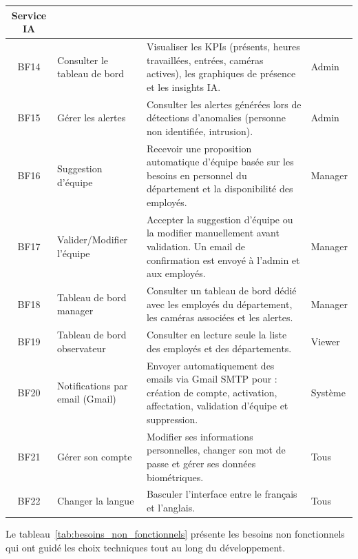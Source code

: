 \begin{longtable}{|c|>{\raggedright\arraybackslash}p{5cm}|>{\raggedright\arraybackslash}p{6cm}|l|}
    Service IA \\
  \hline
  BF14 & Consulter le tableau de bord &
    Visualiser les KPIs (présents, heures travaillées, entrées, caméras actives), les graphiques de présence et les insights IA. &
    Admin \\
  \hline
  BF15 & Gérer les alertes &
    Consulter les alertes générées lors de détections d'anomalies (personne non identifiée, intrusion). &
    Admin \\
  \hline
  BF16 & Suggestion d'équipe &
    Recevoir une proposition automatique d'équipe basée sur les besoins en personnel du département et la disponibilité des employés. &
    Manager \\
  \hline
  BF17 & Valider/Modifier l'équipe &
    Accepter la suggestion d'équipe ou la modifier manuellement avant validation. Un email de confirmation est envoyé à l'admin et aux employés. &
    Manager \\
  \hline
  BF18 & Tableau de bord manager &
    Consulter un tableau de bord dédié avec les employés du département, les caméras associées et les alertes. &
    Manager \\
  \hline
  BF19 & Tableau de bord observateur &
    Consulter en lecture seule la liste des employés et des départements. &
    Viewer \\
  \hline
  BF20 & Notifications par email (Gmail) &
    Envoyer automatiquement des emails via Gmail SMTP pour : création de compte, activation, affectation, validation d'équipe et suppression. &
    Système \\
  \hline
  BF21 & Gérer son compte &
    Modifier ses informations personnelles, changer son mot de passe et gérer ses données biométriques. &
    Tous \\
  \hline
  BF22 & Changer la langue &
    Basculer l'interface entre le français et l'anglais. &
    Tous \\
  \hline
\end{longtable}

Le tableau~\ref{tab:besoins_non_fonctionnels} présente les besoins non fonctionnels qui ont
guidé les choix techniques tout au long du développement.

